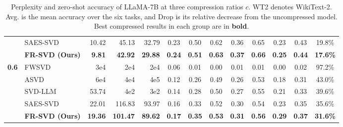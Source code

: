 \begin{table}[t]
\begin{tabular*}{\textwidth}{@{\extracolsep{\fill}}llrrrcccccccc@{}}
 & SAES-SVD                        & 10.42 & 45.13 & 32.79 & 0.23 & 0.50 & 0.62 & 0.36 & 0.65 & 0.23 & 0.43 & 19.8\% \\
\rowcolor{gray!12}
 & \textbf{FR-SVD (Ours)}         & \textbf{9.81} & \textbf{42.92} & \textbf{29.88} & \textbf{0.24} & \textbf{0.51} & \textbf{0.63} & \textbf{0.37} & \textbf{0.66} & \textbf{0.25} & \textbf{0.44} & \textbf{17.6\%} \\
\midrule
\multirow{5}{*}{\textbf{0.6}}
 & FWSVD                          & 3e4   & 2e4   & 2e4   & 0.06 & 0.01 & 0.00 & 0.01 & 0.01 & 0.00 & 0.02 & 97.2\% \\
 & ASVD                            & 6e4   & 4e4   & 4e5   & 0.12 & 0.26 & 0.49 & 0.26 & 0.53 & 0.18 & 0.31 & 43.0\% \\
 & SVD-LLM                         & 53.74 & 4e2   & 3e2   & 0.14 & 0.28 & 0.50 & 0.27 & 0.55 & 0.21 & 0.33 & 39.6\% \\
 & SAES-SVD                        & 22.01 & 116.83 & 93.97 & 0.16 & 0.33 & 0.52 & 0.30 & 0.54 & 0.23 & 0.35 & 35.6\% \\
\rowcolor{gray!12}
 & \textbf{FR-SVD (Ours)}         & \textbf{19.36} & \textbf{101.47} & \textbf{89.62} & \textbf{0.17} & \textbf{0.35} & \textbf{0.53} & \textbf{0.31} & \textbf{0.56} & \textbf{0.29} & \textbf{0.37} & \textbf{31.6\%} \\
\bottomrule
\end{tabular*}
\caption{Perplexity and zero-shot accuracy of LLaMA-7B at three compression ratios $c$.
WT2 denotes WikiText-2. Avg. is the mean accuracy over the six tasks, and Drop is
its relative decrease from the uncompressed model. Best compressed results in each
group are in \textbf{bold}.}
\label{tab:main-results}
\end{table}
